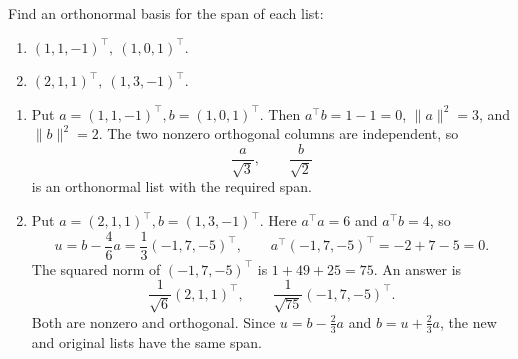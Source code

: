 \begin{problem}\label{ex:06:gs-r3}
Find an orthonormal basis for the span of each list:
\begin{enumerate}
\item \((1,1,-1)^\top,\ (1,0,1)^\top\).
\item \((2,1,1)^\top,\ (1,3,-1)^\top\).
\end{enumerate}
\end{problem}
\begin{solution}
\begin{enumerate}
\item Put \(a=(1,1,-1)^\top,b=(1,0,1)^\top\).
Then \(a^\top b=1-1=0\), \(\|a\|^2=3\), and \(\|b\|^2=2\).
The two nonzero orthogonal columns are independent, so
\[
\frac{a}{\sqrt3},\qquad\frac{b}{\sqrt2}
\]
is an orthonormal list with the required span.
\item Put \(a=(2,1,1)^\top,b=(1,3,-1)^\top\).
Here \(a^\top a=6\) and \(a^\top b=4\), so
\[
u=b-\frac46a=\frac13(-1,7,-5)^\top,\qquad
a^\top(-1,7,-5)^\top=-2+7-5=0.
\]
The squared norm of \((-1,7,-5)^\top\) is \(1+49+25=75\).
An answer is
\[
\frac1{\sqrt6}(2,1,1)^\top,\qquad
\frac1{\sqrt{75}}(-1,7,-5)^\top.
\]
Both are nonzero and orthogonal. Since \(u=b-\frac23a\) and
\(b=u+\frac23a\), the new and original lists have the same span.
\end{enumerate}
\end{solution}

